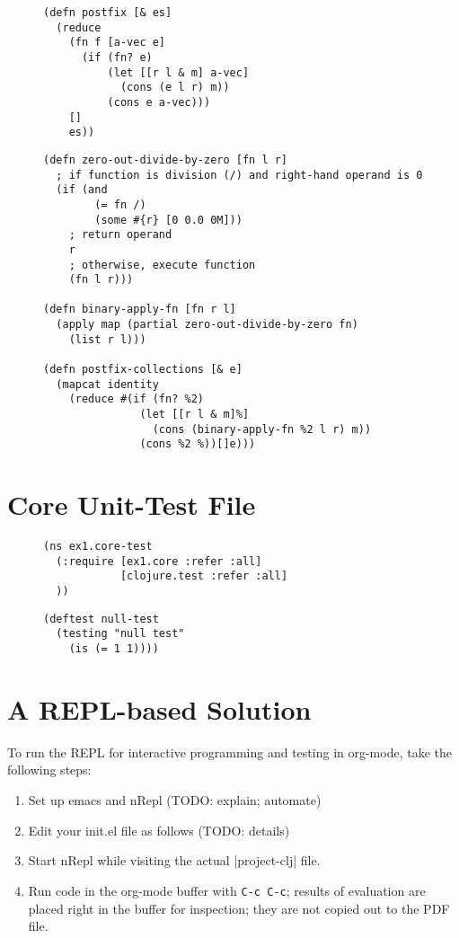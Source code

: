 \documentclass[11pt]{article}
\begin{document}
\begin{figure}[H]
\label{main-postfix}
\begin{verbatim}
(defn postfix [& es]
  (reduce
    (fn f [a-vec e]
      (if (fn? e)
          (let [[r l & m] a-vec]
            (cons (e l r) m))
          (cons e a-vec)))
    []
    es))
\end{verbatim}
\end{figure}

\begin{figure}[H]
\label{main-functions}
\begin{verbatim}
(defn zero-out-divide-by-zero [fn l r]
  ; if function is division (/) and right-hand operand is 0
  (if (and
        (= fn /)
        (some #{r} [0 0.0 0M]))
    ; return operand
    r
    ; otherwise, execute function
    (fn l r)))

(defn binary-apply-fn [fn r l]
  (apply map (partial zero-out-divide-by-zero fn)
    (list r l)))

(defn postfix-collections [& e]
  (mapcat identity
    (reduce #(if (fn? %2)
               (let [[r l & m]%]
                 (cons (binary-apply-fn %2 l r) m))
               (cons %2 %))[]e)))
\end{verbatim}
\end{figure}
\section{Core Unit-Test File}
\label{sec-4}

\begin{figure}[H]
\label{main-test-namespace}
\begin{verbatim}
(ns ex1.core-test
  (:require [ex1.core :refer :all]
            [clojure.test :refer :all]
  ))
\end{verbatim}
\end{figure}

\begin{figure}[H]
\label{test-functions}
\begin{verbatim}
(deftest null-test
  (testing "null test"
    (is (= 1 1))))
\end{verbatim}
\end{figure}
\section{A REPL-based Solution}
\label{sec-5}
\label{sec:emacs-repl}
To run the REPL for interactive programming and testing in org-mode,
take the following steps:
\begin{enumerate}
\item Set up emacs and nRepl (TODO: explain; automate)
\item Edit your init.el file as follows (TODO: details)
\item Start nRepl while visiting the actual |project-clj| file.
\item Run code in the org-mode buffer with \verb|C-c C-c|; results of
evaluation are placed right in the buffer for inspection; they are
not copied out to the PDF file.
\end{enumerate}
\end{document}
